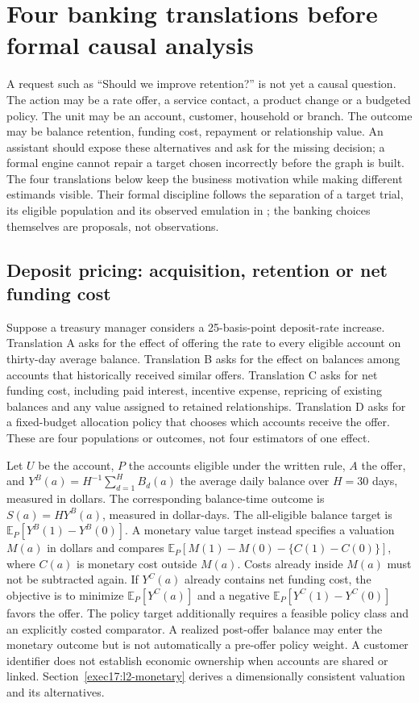 \chapter{Four banking translations before formal causal analysis}
\label{exec13:l2-translation}

A request such as ``Should we improve retention?'' is not yet a causal question. The action may be a rate offer, a service contact, a product change or a budgeted policy. The unit may be an account, customer, household or branch. The outcome may be balance retention, funding cost, repayment or relationship value. An assistant should expose these alternatives and ask for the missing decision; a formal engine cannot repair a target chosen incorrectly before the graph is built. The four translations below keep the business motivation while making different estimands visible. Their formal discipline follows the separation of a target trial, its eligible population and its observed emulation in \citet{hernan2020}; the banking choices themselves are proposals, not observations.

\section{Deposit pricing: acquisition, retention or net funding cost}

Suppose a treasury manager considers a 25-basis-point deposit-rate increase. Translation A asks for the effect of offering the rate to every eligible account on thirty-day average balance. Translation B asks for the effect on balances among accounts that historically received similar offers. Translation C asks for net funding cost, including paid interest, incentive expense, repricing of existing balances and any value assigned to retained relationships. Translation D asks for a fixed-budget allocation policy that chooses which accounts receive the offer. These are four populations or outcomes, not four estimators of one effect.

Let $U$ be the account, $P$ the accounts eligible under the written rule, $A$ the offer, and $Y^B(a)=H^{-1}\sum_{d=1}^H B_d(a)$ the average daily balance over $H=30$ days, measured in dollars. The corresponding balance-time outcome is $S(a)=H Y^B(a)$, measured in dollar-days. The all-eligible balance target is $\mathbb E_P[Y^B(1)-Y^B(0)]$. A monetary value target instead specifies a valuation $M(a)$ in dollars and compares $\mathbb E_P[M(1)-M(0)-\{C(1)-C(0)\}]$, where $C(a)$ is monetary cost outside $M(a)$. Costs already inside $M(a)$ must not be subtracted again. If $Y^C(a)$ already contains net funding cost, the objective is to minimize $\mathbb E_P[Y^C(a)]$ and a negative $\mathbb E_P[Y^C(1)-Y^C(0)]$ favors the offer. The policy target additionally requires a feasible policy class and an explicitly costed comparator. A realized post-offer balance may enter the monetary outcome but is not automatically a pre-offer policy weight. A customer identifier does not establish economic ownership when accounts are shared or linked. Section~\ref{exec17:l2-monetary} derives a dimensionally consistent valuation and its alternatives.

